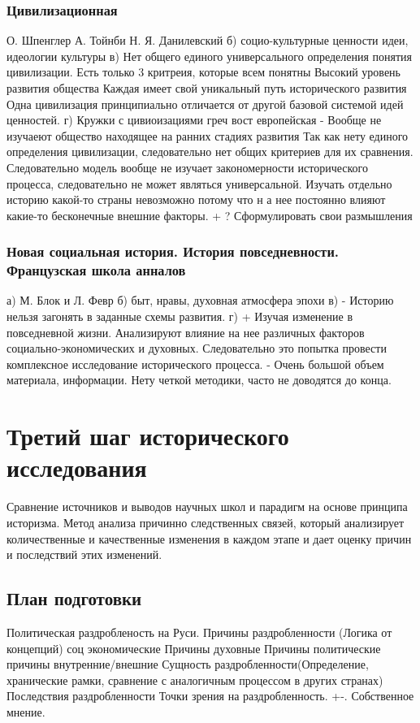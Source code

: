 \documentclass[a4paper]{article}
\begin{document}
\subsubsection{Цивилизационная}
О. Шпенглер
А. Тойнби
Н. Я. Данилевский
б) социо-культурные ценности идеи, идеологии культуры
в) Нет общего единого универсального определения понятия цивилизации. Есть только 3 критреия, которые всем понятны 
    Высокий уровень развития общества
    Каждая имеет свой уникальный путь исторического развития
    Одна цивилизация принципиально отличается от другой базовой системой идей ценностей.
г) Кружки с цивиоизациями греч вост европейская
- Вообще не изучаеют общество находящее на ранних стадиях развития
  Так как нету единого определения цивилизации, следовательно нет общих критериев для их сравнения. Следовательно модель вообще не изучает закономерности исторического процесса, следовательно не может являться универсальной.
  Изучать отдельно историю какой-то страны невозможно потому что н а нее постоянно влияют какие-то бесконечные внешние факторы.
+ ? Сформулировать свои размышления
\subsubsection{Новая социальная история. История повседневности. Французская школа анналов}
а) М. Блок и Л. Февр
б) быт, нравы, духовная атмосфера эпохи
в) - Историю нельзя загонять в заданные схемы развития.
г) 
+ Изучая изменение в повседневной жизни. Анализируют влияние на нее различных факторов социально-экономических и духовных. Следовательно это попытка провести комплексное исследование исторического процесса.  
- Очень большой объем материала, информации. Нету четкой методики, часто не доводятся до конца.

\section{Третий шаг исторического исследования}
Сравнение источников и выводов научных школ и парадигм на основе принципа историзма. Метод анализа причинно следственных связей, который анализирует количественные и качественные изменения в каждом этапе и дает оценку причин и последствий этих изменений.
\subsection{План подготовки }
Политическая раздробленость на Руси.
Причины раздробленности (Логика от концепций)
    соц экономические Причины
    духовные Причины
    политические причины внутренние/внешние
Сущность раздробленности(Определение, хранические рамки, сравнение с аналогичным процессом в других странах)
Последствия раздробленности
Точки зрения на раздробленность. +-. Собственное мнение.
\end{document}
